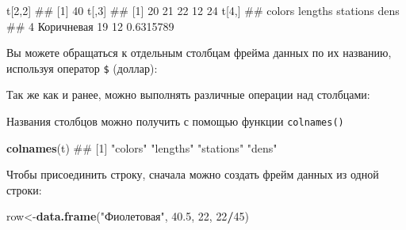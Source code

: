 \documentclass[]{book}
\newenvironment{Shaded}{\begin{snugshade}}{\end{snugshade}}
\newcommand{\KeywordTok}[1]{\textcolor[rgb]{0.13,0.29,0.53}{\textbf{#1}}}
\newcommand{\DecValTok}[1]{\textcolor[rgb]{0.00,0.00,0.81}{#1}}
\newcommand{\FloatTok}[1]{\textcolor[rgb]{0.00,0.00,0.81}{#1}}
\newcommand{\StringTok}[1]{\textcolor[rgb]{0.31,0.60,0.02}{#1}}
\newcommand{\OperatorTok}[1]{\textcolor[rgb]{0.81,0.36,0.00}{\textbf{#1}}}
\newcommand{\NormalTok}[1]{#1}
\begin{document}
\begin{Shaded}
\begin{Highlighting}[]
\NormalTok{t[}\DecValTok{2}\NormalTok{,}\DecValTok{2}\NormalTok{]}
\NormalTok{## [1] 40}
\NormalTok{t[,}\DecValTok{3}\NormalTok{]}
\NormalTok{## [1] 20 21 22 12 24}
\NormalTok{t[}\DecValTok{4}\NormalTok{,]}
\NormalTok{##       colors lengths stations      dens}
\NormalTok{## 4 Коричневая      19       12 0.6315789}
\end{Highlighting}
\end{Shaded}

Вы можете обращаться к отдельным столбцам фрейма данных по их названию,
используя оператор \texttt{\$} (доллар):

\begin{Shaded}
\end{Shaded}

Так же как и ранее, можно выполнять различные операции над столбцами:

\begin{Shaded}
\end{Shaded}

Названия столбцов можно получить с помощью функции \texttt{colnames()}

\begin{Shaded}
\begin{Highlighting}[]
\KeywordTok{colnames}\NormalTok{(t)}
\NormalTok{## [1] "colors"   "lengths"  "stations" "dens"}
\end{Highlighting}
\end{Shaded}

Чтобы присоединить строку, сначала можно создать фрейм данных из одной
строки:

\begin{Shaded}
\begin{Highlighting}[]
\NormalTok{row<-}\KeywordTok{data.frame}\NormalTok{(}\StringTok{"Фиолетовая"}\NormalTok{, }\FloatTok{40.5}\NormalTok{, }\DecValTok{22}\NormalTok{, }\DecValTok{22}\OperatorTok{/}\DecValTok{45}\NormalTok{)}
\end{Highlighting}
\end{Shaded}
\end{document}
